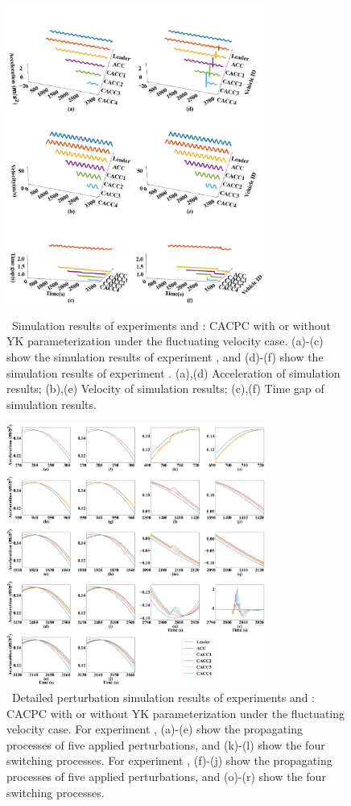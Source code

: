 \documentclass[journal]{IEEEtran}
\begin{document}
\begin{figure}
  \centering
  \includegraphics[width=8.5cm]{figs/f_YK_form.png}
  \caption{~Simulation results of experiments \uppercase\expandafter{} and \uppercase\expandafter{}: CACPC with or without YK parameterization under the fluctuating velocity case. (a)-(c) show the simulation results of experiment \uppercase\expandafter{}, and (d)-(f) show the simulation results of experiment \uppercase\expandafter{}. (a),(d) Acceleration of simulation results; (b),(e) Velocity of simulation results; (c),(f) Time gap of simulation results.}
  \label{new5}
\end{figure}

\begin{figure}
  \centering
  \includegraphics[width=8.5cm]{figs/fluat_detail.png}
  \caption{~Detailed perturbation simulation results of experiments \uppercase\expandafter{} and \uppercase\expandafter{}: CACPC with or without YK parameterization under the fluctuating velocity case. For experiment \uppercase\expandafter{}, (a)-(e) show the propagating processes of five applied perturbations, and (k)-(l) show the four switching processes. For experiment \uppercase\expandafter{}, (f)-(j) show the propagating processes of five applied perturbations, and (o)-(r) show the four switching processes.}
  \label{new6}
\end{figure}
\end{document}
